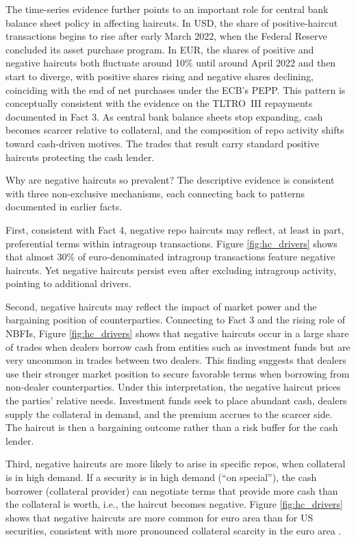 \documentclass[english, 12pt, oneside]{article}
\begin{document}
The time-series evidence further points to an important role for central bank balance sheet policy in affecting haircuts. In USD, the share of positive-haircut transactions begins to rise after early March 2022, when the Federal Reserve concluded its asset purchase program. In EUR, the shares of positive and negative haircuts both fluctuate around 10\% until around April 2022 and then start to diverge, with positive shares rising and negative shares declining, coinciding with the end of net purchases under the ECB's PEPP. This pattern is conceptually consistent with the evidence on the TLTRO~III repayments documented in Fact 3. As central bank balance sheets stop expanding, cash becomes scarcer relative to collateral, and the composition of repo activity shifts toward cash-driven motives. The trades that result carry standard positive haircuts protecting the cash lender.

Why are negative haircuts so prevalent? The descriptive evidence is consistent with three non-exclusive mechanisms, each connecting back to patterns documented in earlier facts. 

First, consistent with Fact 4, negative repo haircuts may reflect, at least in part, preferential terms within intragroup transactions. Figure \ref{fig:hc_drivers} shows that almost 30\% of euro-denominated intragroup transactions feature negative haircuts. Yet negative haircuts persist even after excluding intragroup activity, pointing to additional drivers.

Second, negative haircuts may reflect the impact of market power and the bargaining position of counterparties. Connecting to Fact 3 and the rising role of NBFIs, Figure \ref{fig:hc_drivers} shows that negative haircuts occur in a large share of trades when dealers borrow cash from entities such as investment funds but are very uncommon in trades between two dealers. This finding suggests that dealers use their stronger market position to secure favorable terms when borrowing from non-dealer counterparties. Under this interpretation, the negative haircut prices the parties' relative needs. Investment funds seek to place abundant cash, dealers supply the collateral in demand, and the premium accrues to the scarcer side. The haircut is then a bargaining outcome rather than a risk buffer for the cash lender.


Third, negative haircuts are more likely to arise in specific repos, when collateral is in high demand. If a security is in high demand (``on special''), the cash borrower (collateral provider) can negotiate terms that provide more cash than the collateral is worth, i.e., the haircut becomes negative. Figure \ref{fig:hc_drivers} shows that negative haircuts are more common for euro area than for US securities, consistent with more pronounced collateral scarcity in the euro area \citep{nguyen2023}.
\end{document}

